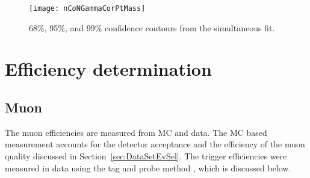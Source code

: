     \begin{figure}[!Hhbt]
      \centering
      \texttt{[image: nCoNGammaCorPtMass]}
      \caption{68\%, 95\%, and 99\% confidence contours from the 
        simultaneous fit. }
      \label{fig:simGaussCor}
    \end{figure}

  \section{\label{sec:effDet} Efficiency determination}
    \subsection{Muon \DIFdelbegin {}\DIFdelend \DIFaddbegin {}\DIFaddend }
      The muon efficiencies are measured from MC and data.
      The MC based measurement accounts for the detector acceptance and the 
        efficiency of the muon quality discussed in 
        Section~\ref{sec:DataSetEvSel}.
      The trigger efficiencies were measured in data using the tag and probe 
      method \DIFaddbegin {}\DIFaddend , which is discussed below. 

